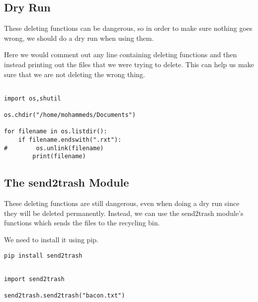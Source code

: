 \documentclass[11pt]{article}
\begin{document}
\subsection{Dry Run}
\label{sec:orgcd6c895}

These deleting functions can be dangerous, so in order to make sure nothing goes wrong, we should do a dry run when using them.

Here we would comment out any line containing deleting functions and then instead printing out the files that we were trying to delete. This can help us make sure that we are not deleting the wrong thing.

\begin{verbatim}

import os,shutil

os.chdir("/home/mohammeds/Documents")

for filename in os.listdir():
    if filename.endswith(".rxt"):
#        os.unlink(filename)
        print(filename)

\end{verbatim}

\subsection{The send2trash Module}
\label{sec:org0a7c439}

These deleting functions are still dangerous, even when doing a dry run since they will be deleted permanently. Instead, we can use the send2trash module's functions which sends the files to the recycling bin.

We need to install it using pip.

\begin{verbatim}
pip install send2trash
\end{verbatim}

\begin{verbatim}

import send2trash

send2trash.send2trash("bacon.txt")

\end{verbatim}
\end{document}
